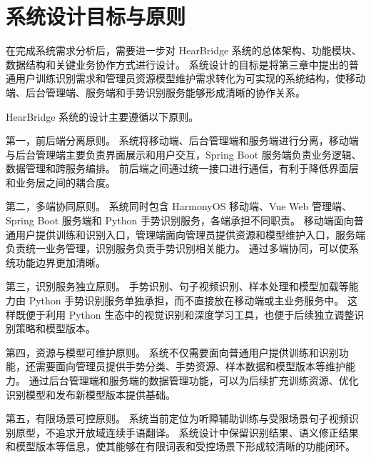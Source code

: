 
\section{系统设计目标与原则}

在完成系统需求分析后，需要进一步对 HearBridge 系统的总体架构、功能模块、数据结构和关键业务协作方式进行设计。
系统设计的目标是将第三章中提出的普通用户训练识别需求和管理员资源模型维护需求转化为可实现的系统结构，使移动端、后台管理端、服务端和手势识别服务能够形成清晰的协作关系。

HearBridge 系统的设计主要遵循以下原则。

第一，前后端分离原则。
系统将移动端、后台管理端和服务端进行分离，移动端与后台管理端主要负责界面展示和用户交互，Spring Boot 服务端负责业务逻辑、数据管理和跨服务编排。
前后端之间通过统一接口进行通信，有利于降低界面层和业务层之间的耦合度。

第二，多端协同原则。
系统同时包含 HarmonyOS 移动端、Vue Web 管理端、Spring Boot 服务端和 Python 手势识别服务，各端承担不同职责。
移动端面向普通用户提供训练和识别入口，管理端面向管理员提供资源和模型维护入口，服务端负责统一业务管理，识别服务负责手势识别相关能力。
通过多端协同，可以使系统功能边界更加清晰。

第三，识别服务独立原则。
手势识别、句子视频识别、样本处理和模型加载等能力由 Python 手势识别服务单独承担，而不直接放在移动端或主业务服务中。
这样既便于利用 Python 生态中的视觉识别和深度学习工具，也便于后续独立调整识别策略和模型版本。

第四，资源与模型可维护原则。
系统不仅需要面向普通用户提供训练和识别功能，还需要面向管理员提供手势分类、手势资源、样本数据和模型版本等维护能力。
通过后台管理端和服务端的数据管理功能，可以为后续扩充训练资源、优化识别模型和发布新模型版本提供基础。

第五，有限场景可控原则。
系统当前定位为听障辅助训练与受限场景句子视频识别原型，不追求开放域连续手语翻译。
系统设计中保留识别结果、语义修正结果和模型版本等信息，使其能够在有限词表和受控场景下形成较清晰的功能闭环。
